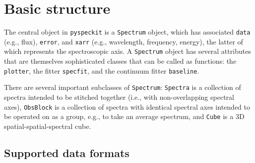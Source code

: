 \documentclass[twocolumn]{aastex61}
\newcommand{\pyspeckit}{\texttt{pyspeckit}\xspace}
\begin{document}
\section{Basic structure}
The central object in \pyspeckit is a \texttt{Spectrum} object, which has
associated \texttt{data} (e.g., flux), \texttt{error}, and \texttt{xarr} (e.g., wavelength,
frequency, energy), the latter of
which represents the spectroscopic axis.  A \texttt{Spectrum} object has
several attributes that are themselves sophisticated classes that can be called
as functions: the \texttt{plotter}, the fitter \texttt{specfit}, and the
continuum fitter \texttt{baseline}.

There are several important subclasses of \texttt{Spectrum}: \texttt{Spectra}
is a collection of spectra intended to be stitched together (i.e., with
non-overlapping spectral axes), \texttt{ObsBlock} is a collection of spectra
with identical spectral axes intended to be operated on as a group, e.g., to
take an average spectrum, and \texttt{Cube} is a 3D spatial-spatial-spectral
cube.

\subsection{Supported data formats}
\end{document}

